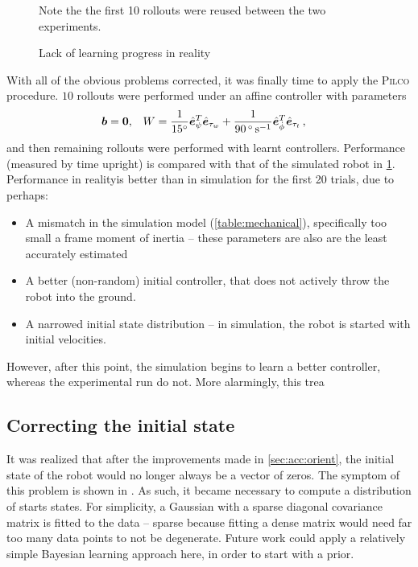 \documentclass[main.tex]{subfiles}
\begin{document}
	\begin{figure}[b!]
		\centering
		\begin{minipage}{0.5\linewidth - 2em}
			
		\end{minipage}\hfill
		\begin{minipage}{0.5\linewidth - 2em}
			
		\end{minipage}
		\caption{Lack of learning progress in reality}
		\label{fig:learning-compare}
		\medskip
		\small
		Note the the first 10 rollouts were reused between the two experiments.
	\end{figure}

	With all of the obvious problems corrected, it was finally time to apply the \textsc{Pilco} procedure.
	$10$ rollouts were performed under an affine controller with parameters
	\begin{align}
		\bm{b} &= \bm{0}, &
		W &=
			\frac{1}{\SI{15}{\degree}}
			\hat{\bm{e}}_{\psi}^T\hat{\bm{e}}_{\tau_w}
			+ \frac{1}{\SI{90}{\degree\per\second}}
			\hat{\bm{e}}_{\dot\phi}^T\hat{\bm{e}}_{\tau_t}\,,
	\end{align}
	and then remaining rollouts were performed with learnt controllers.
	Performance (measured by time upright) is compared with that of the simulated robot in \cref{fig:learning-compare}.
	Performance in reality\footnotemark is better than in simulation for the first 20 trials, due to perhaps:
	\begin{itemize}[noitemsep]
		\item A mismatch in the simulation model (\cref{table:mechanical}), specifically too small a frame moment of inertia -- these parameters are also are the least accurately estimated
		\item A better (non-random) initial controller, that does not actively throw the robot into the ground.
		\item A narrowed initial state distribution -- in simulation, the robot is started with initial velocities.
	\end{itemize}
	However, after this point, the simulation begins to learn a better controller, whereas the experimental run do not.
	More alarmingly, this trea

	\subsection{Correcting the initial state}
	It was realized that after the improvements made in \cref{sec:acc:orient}, the initial state of the robot would no longer always be a vector of zeros. The symptom of this problem is shown in \todo{}.
	As such, it became necessary to compute a distribution of starts states.
	For simplicity, a Gaussian with a sparse diagonal covariance matrix is fitted to the data -- sparse because fitting a dense matrix would need far too many data points to not be degenerate. Future work could apply a relatively simple Bayesian learning approach here, in order to start with a prior.
\end{document}
